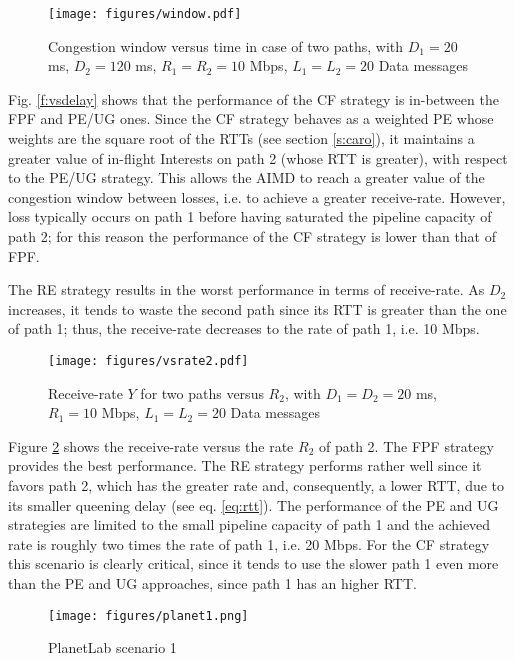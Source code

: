\documentclass{sig-alternate-10pt}
\begin{document}
\begin{figure}[t]
\centering
\texttt{[image: figures/window.pdf]}
\caption{Congestion window versus time in case of two paths, with $D_1=20$ ms, $D_2=120$ ms, $R_1=R_2=10$ Mbps, $L_1=L_2=20$ Data messages}
\label{f:window}
\vspace{-10pt}
\end{figure}

Fig. \ref{f:vsdelay} shows that the performance of the CF strategy is in-between the FPF and PE/UG ones. Since the CF strategy behaves as a weighted PE whose weights are the square root of the RTTs (see section \ref{s:caro}), it maintains a greater value of in-flight Interests on path 2 (whose RTT is greater), with respect to the PE/UG strategy. This allows the AIMD to reach a greater value of the congestion window between losses, i.e. to achieve a greater receive-rate. However, loss typically occurs on path 1 before having saturated the pipeline capacity of path 2; for this reason the performance of the CF strategy is lower than that of FPF.

The RE strategy results in the worst performance in terms of receive-rate. As $D_2$ increases, it tends to waste the second path since its RTT is greater than the one of path 1; thus, the receive-rate decreases to the rate of path 1, i.e. 10 Mbps.

\begin{figure}[t]
\centering
\texttt{[image: figures/vsrate2.pdf]}
\caption{Receive-rate $Y$ for two paths versus $R_2$, with $D_1=D_2=20$ ms, $R_1=10$ Mbps, $L_1=L_2=20$ Data messages}
\label{f:vsrate}
\vspace{-10pt}
\end{figure}

Figure \ref{f:vsrate} shows the receive-rate versus the rate $R_2$ of path 2. The FPF strategy provides the best performance. The RE strategy performs rather well since it favors path 2, which has the greater rate and, consequently, a lower RTT, due to its smaller queening delay (see eq. \ref{eq:rtt}). The performance of the PE and UG strategies are limited to the small pipeline capacity of path 1 and the achieved rate is roughly two times the rate of path 1, i.e. 20 Mbps. For the CF strategy this scenario is clearly critical, since it tends to use the slower path 1 even more than the PE and UG approaches, since path 1 has an higher RTT.

\begin{figure}[t]
\centering
\texttt{[image: figures/planet1.png]}
\caption{PlanetLab scenario 1}
\label{f:plscen1}
\vspace{-10pt}
\end{figure}
\end{document}

